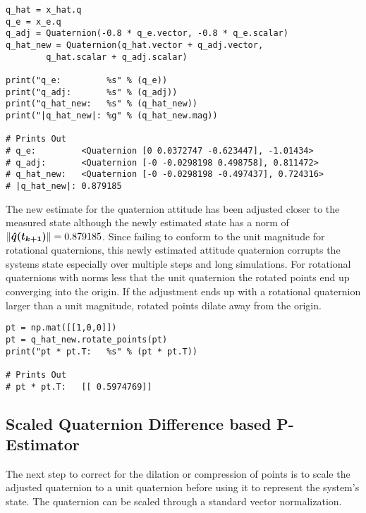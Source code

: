 \begin{singlespace}
  \begin{verbatim}
q_hat = x_hat.q
q_e = x_e.q
q_adj = Quaternion(-0.8 * q_e.vector, -0.8 * q_e.scalar)
q_hat_new = Quaternion(q_hat.vector + q_adj.vector,
        q_hat.scalar + q_adj.scalar)

print("q_e:         %s" % (q_e))
print("q_adj:       %s" % (q_adj))
print("q_hat_new:   %s" % (q_hat_new))
print("|q_hat_new|: %g" % (q_hat_new.mag))

# Prints Out
# q_e:         <Quaternion [0 0.0372747 -0.623447], -1.01434>
# q_adj:       <Quaternion [-0 -0.0298198 0.498758], 0.811472>
# q_hat_new:   <Quaternion [-0 -0.0298198 -0.497437], 0.724316>
# |q_hat_new|: 0.879185
  \end{verbatim}
\nocite{minted}
\end{singlespace}

The new estimate for the quaternion attitude has been adjusted closer to the measured state although the newly estimated state has a norm of $ \| \boldsymbol{\hat{q}(t_{k+1})} \| = 0.879185$.  Since failing to conform to the unit magnitude for rotational quaternions, this newly estimated attitude quaternion corrupts the systems state especially over multiple steps and long simulations.  For rotational quaternions with norms less that the unit quaternion the rotated points end up converging into the origin.  If the adjustment ends up with a rotational quaternion larger than a unit magnitude, rotated points dilate away from the origin.

\begin{singlespace}
  \begin{verbatim}
pt = np.mat([[1,0,0]])
pt = q_hat_new.rotate_points(pt)
print("pt * pt.T:   %s" % (pt * pt.T))

# Prints Out
# pt * pt.T:   [[ 0.5974769]]
  \end{verbatim}
\nocite{minted}
\end{singlespace}


\subsection{Scaled Quaternion Difference based P-Estimator}
\label{sec:ScaledQuaternionDifferencebasedPEstimator}

The next step to correct for the dilation or compression of points is to scale the adjusted quaternion to a unit quaternion before using it to represent the system's state.  The quaternion can be scaled through a standard vector normalization.

